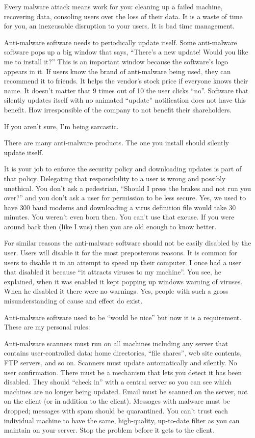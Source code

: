 \documentclass{article}
\begin{document}
Every malware attack means work for you: cleaning up a failed machine, recovering data, consoling users over the loss of their data. It is a waste of time for you, an inexcusable disruption to your users. It is bad time management.

Anti-malware software needs to periodically update itself. Some anti-malware software pops up a big window that says, ``There's a new update! Would you like me to install it?'' This is an important window because the software's logo appears in it. If users know the brand of anti-malware being used, they can recommend it to friends. It helps the vendor's stock price if everyone knows their name. It doesn't matter that 9 times out of 10 the user clicks ``no''. Software that silently updates itself with no animated ``update'' notification does not have this benefit. How irresponsible of the company to not benefit their shareholders.

If you aren't sure, I'm being sarcastic.

There are many anti-malware products. The one you install should silently update itself.

It is your job to enforce the security policy and downloading updates is part of that policy. Delegating that responsibility to a user is wrong and possibly unethical. You don't ask a pedestrian, ``Should I press the brakes and not run you over?'' and you don't ask a user for permission to be less secure. Yes, we used to have 300 baud modems and downloading a virus definition file would take 30 minutes. You weren't even born then. You can't use that excuse. If you were around back then (like I was) then you are old enough to know better.

For similar reasons the anti-malware software should not be easily disabled by the user. Users will disable it for the most preposterous reasons. It is common for users to disable it in an attempt to speed up their computer. I once had a user that disabled it because ``it attracts viruses to my machine''. You see, he explained, when it was enabled it kept popping up windows warning of viruses. When he disabled it there were no warnings. Yes, people with such a gross misunderstanding of cause and effect do exist.

Anti-malware software used to be ``would be nice'' but now it is a requirement. These are my personal rules:

Anti-malware scanners must run on all machines including any server that contains user-controlled data: home directories, ``file shares'', web site contents, FTP servers, and so on.
Scanners must update automatically and silently. No user confirmation.
There must be a mechanism that lets you detect it has been disabled. They should ``check in'' with a central server so you can see which machines are no longer being updated.
Email must be scanned on the server, not on the client (or in addition to the client). Messages with malware must be dropped; messages with spam should be quarantined. You can't trust each individual machine to have the same, high-quality, up-to-date filter as you can maintain on your server. Stop the problem before it gets to the client.
\end{document}
